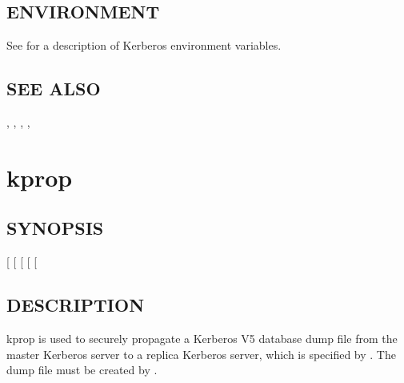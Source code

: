 \documentclass[letterpaper,10pt,english]{sphinxmanual}
\begin{document}
\subsection{ENVIRONMENT}
\label{\detokenize{admin/admin_commands/krb5kdc:environment}}
See  for a description of Kerberos environment
variables.


\subsection{SEE ALSO}
\label{\detokenize{admin/admin_commands/krb5kdc:see-also}}
{\hyperref[\detokenize{admin/admin_commands/kdb5_util:kdb5-util-8}]{}}, {\hyperref[\detokenize{admin/conf_files/kdc_conf:kdc-conf-5}]{}}, {\hyperref[\detokenize{admin/conf_files/krb5_conf:krb5-conf-5}]{}},
{\hyperref[\detokenize{admin/admin_commands/kdb5_ldap_util:kdb5-ldap-util-8}]{}}, 


\section{kprop}
\label{\detokenize{admin/admin_commands/kprop:kprop-8}}\label{\detokenize{admin/admin_commands/kprop::doc}}\label{\detokenize{admin/admin_commands/kprop:kprop}}

\subsection{SYNOPSIS}
\label{\detokenize{admin/admin_commands/kprop:synopsis}}
{[} \sphinxstyleemphasis{realm}{]}
{[} \sphinxstyleemphasis{file}{]}
{[}\sphinxstylestrong{-d}{]}
{[} \sphinxstyleemphasis{port}{]}
{[} \sphinxstyleemphasis{keytab}{]}


\subsection{DESCRIPTION}
\label{\detokenize{admin/admin_commands/kprop:description}}
kprop is used to securely propagate a Kerberos V5 database dump file
from the master Kerberos server to a replica Kerberos server, which is
specified by .  The dump file must be created by
{\hyperref[\detokenize{admin/admin_commands/kdb5_util:kdb5-util-8}]{}}.
\end{document}
